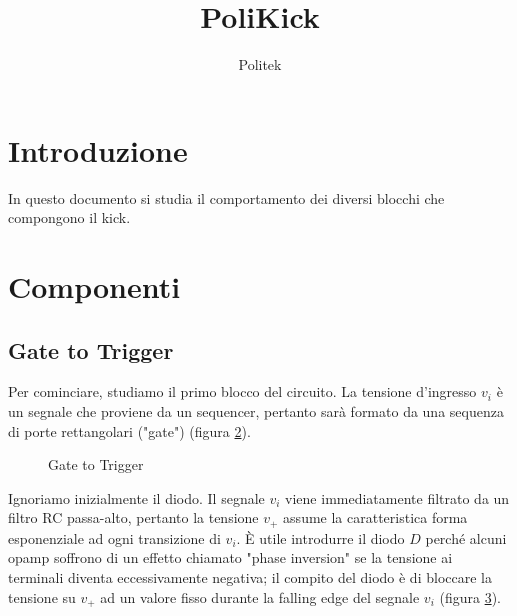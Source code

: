 \documentclass{article}
\title{PoliKick}
\author{Politek}
\begin{document}
\maketitle



\section{Introduzione}
In questo documento si studia il comportamento dei diversi blocchi che compongono il kick.

\section{Componenti}

\subsection{Gate to Trigger}

Per cominciare, studiamo il primo blocco del circuito. La tensione d'ingresso \(v_i\) è un segnale che proviene da un sequencer, pertanto sarà formato da una sequenza di porte rettangolari ("gate") (figura \ref{fig:sequencer-signal}).

\begin{figure}[ht]
    \centering
    
    \label{fig:gate-to-trigger}
    \caption{Gate to Trigger}
\end{figure}

\begin{figure}[ht]
    \centering
    \label{fig:sequencer-signal}
\end{figure}

Ignoriamo inizialmente il diodo. Il segnale \(v_i\) viene immediatamente filtrato da un filtro RC passa-alto, pertanto la tensione \(v_+\) assume la caratteristica forma esponenziale ad ogni transizione di \(v_i\).
È utile introdurre il diodo \(D\) perché alcuni opamp soffrono di un effetto chiamato "phase inversion" se la tensione ai terminali diventa eccessivamente negativa; il compito del diodo è di bloccare la tensione su \(v_+\) ad un valore fisso durante la falling edge del segnale \(v_i\) (figura \ref{fig:sequencer-signal-hpf}).

\begin{figure}[ht]
    \centering
    \label{fig:sequencer-signal-hpf}
\end{figure}
\end{document}

